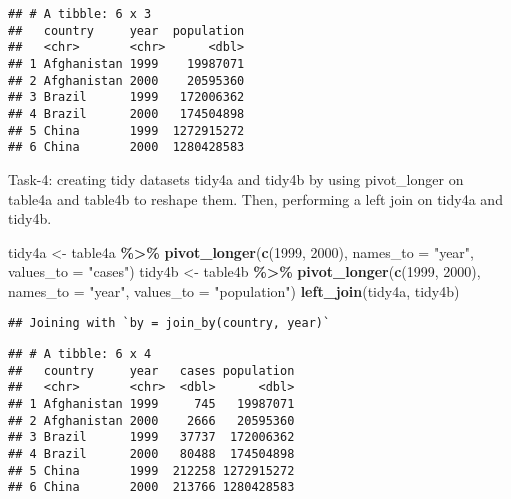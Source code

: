 \documentclass[
]{article}
\newenvironment{Shaded}{\begin{snugshade}}{\end{snugshade}}
\newcommand{\AttributeTok}[1]{\textcolor[rgb]{0.13,0.29,0.53}{#1}}
\newcommand{\FunctionTok}[1]{\textcolor[rgb]{0.13,0.29,0.53}{\textbf{#1}}}
\newcommand{\NormalTok}[1]{#1}
\newcommand{\OtherTok}[1]{\textcolor[rgb]{0.56,0.35,0.01}{#1}}
\newcommand{\SpecialCharTok}[1]{\textcolor[rgb]{0.81,0.36,0.00}{\textbf{#1}}}
\newcommand{\StringTok}[1]{\textcolor[rgb]{0.31,0.60,0.02}{#1}}
\begin{document}
\begin{verbatim}
## # A tibble: 6 x 3
##   country     year  population
##   <chr>       <chr>      <dbl>
## 1 Afghanistan 1999    19987071
## 2 Afghanistan 2000    20595360
## 3 Brazil      1999   172006362
## 4 Brazil      2000   174504898
## 5 China       1999  1272915272
## 6 China       2000  1280428583
\end{verbatim}

Task-4: creating tidy datasets tidy4a and tidy4b by using pivot\_longer
on table4a and table4b to reshape them. Then, performing a left join on
tidy4a and tidy4b.

\begin{Shaded}
\begin{Highlighting}[]
\NormalTok{tidy4a }\OtherTok{\textless{}{-}}\NormalTok{ table4a }\SpecialCharTok{\%\textgreater{}\%} 
  \FunctionTok{pivot\_longer}\NormalTok{(}\FunctionTok{c}\NormalTok{(}\StringTok{\textasciigrave{}}\AttributeTok{1999}\StringTok{\textasciigrave{}}\NormalTok{, }\StringTok{\textasciigrave{}}\AttributeTok{2000}\StringTok{\textasciigrave{}}\NormalTok{), }\AttributeTok{names\_to =} \StringTok{"year"}\NormalTok{, }\AttributeTok{values\_to =} \StringTok{"cases"}\NormalTok{)}
\NormalTok{tidy4b }\OtherTok{\textless{}{-}}\NormalTok{ table4b }\SpecialCharTok{\%\textgreater{}\%} 
  \FunctionTok{pivot\_longer}\NormalTok{(}\FunctionTok{c}\NormalTok{(}\StringTok{\textasciigrave{}}\AttributeTok{1999}\StringTok{\textasciigrave{}}\NormalTok{, }\StringTok{\textasciigrave{}}\AttributeTok{2000}\StringTok{\textasciigrave{}}\NormalTok{), }\AttributeTok{names\_to =} \StringTok{"year"}\NormalTok{, }\AttributeTok{values\_to =} \StringTok{"population"}\NormalTok{)}
\FunctionTok{left\_join}\NormalTok{(tidy4a, tidy4b)}
\end{Highlighting}
\end{Shaded}

\begin{verbatim}
## Joining with `by = join_by(country, year)`
\end{verbatim}

\begin{verbatim}
## # A tibble: 6 x 4
##   country     year   cases population
##   <chr>       <chr>  <dbl>      <dbl>
## 1 Afghanistan 1999     745   19987071
## 2 Afghanistan 2000    2666   20595360
## 3 Brazil      1999   37737  172006362
## 4 Brazil      2000   80488  174504898
## 5 China       1999  212258 1272915272
## 6 China       2000  213766 1280428583
\end{verbatim}
\end{document}
